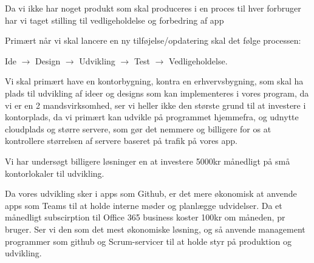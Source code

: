 

Da vi ikke har noget produkt som skal produceres i en proces til hver forbruger har vi taget stilling til vedligeholdelse og forbedring af app 

Primært når vi skal lancere en ny tilføjelse/opdatering skal det følge processen: 

Ide $\rightarrow$ Design $\rightarrow$ Udvikling $\rightarrow$ Test $\rightarrow$ Vedligeholdelse. 

Vi skal primært have en kontorbygning, kontra en erhvervsbygning, som skal ha plads til udvikling af ideer og designs som kan implementeres i vores program, da vi er en 2 mandsvirksomhed, ser vi heller ikke den største grund til at investere i kontorplads, da vi primært kan udvikle på programmet hjemmefra, og udnytte cloudplads og større servere, som gør det nemmere og billigere for os at kontrollere størrelsen af servere baseret på trafik på vores app. 

Vi har undersøgt billigere løsninger en at investere 5000kr månedligt på små kontorlokaler til udvikling. 

Da vores udvikling sker i apps som Github, er det mere økonomisk at anvende apps som Teams til at holde interne møder og planlægge udvidelser. Da et månedligt subscirption til Office 365 business koster 100kr om måneden, pr bruger. Ser vi den som det mest økonomiske løsning, og så anvende management programmer som github og Scrum-servicer til at holde styr på produktion og udvikling. 

 

 

 

 